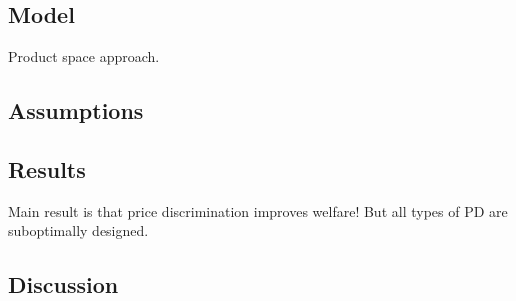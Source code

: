 \subsection{Model}

Product space approach.

\subsection{Assumptions}



\subsection{Results}

Main result is that price discrimination improves welfare! But all types of PD are suboptimally designed.

\subsection{Discussion}

